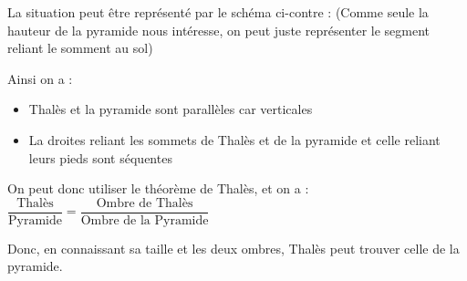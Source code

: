 \begin{minipage}[t]{0.55\textwidth}
    \exo{}{}

    La situation peut être représenté par le schéma ci-contre : 
    (Comme seule la hauteur de la pyramide nous intéresse, on peut juste représenter le segment reliant le somment au sol)

    Ainsi on a :
    \begin{itemize}
        \item Thalès et la pyramide sont parallèles car verticales
        \item La droites reliant les sommets de Thalès et de la pyramide et celle reliant leurs pieds sont séquentes
    \end{itemize}

    On peut donc utiliser le théorème de Thalès, et on a :\\
    $\dfrac{\text{Thalès}}{\text{Pyramide}}=\dfrac{\text{Ombre de Thalès}}{\text{Ombre de la Pyramide}}$

    Donc, en connaissant sa taille et les deux ombres, Thalès peut trouver celle de la pyramide.
    
\end{minipage}
\hfill
\begin{minipage}[t]{0.35\textwidth}
        \begin{figure}[H]
        \centering
    \end{figure} 
\end{minipage}

\newpage


